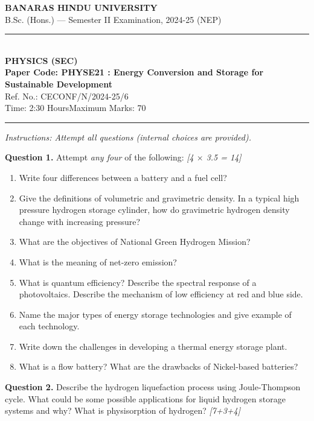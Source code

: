 \documentclass[11pt,a4paper]{article}
\newcommand{\pts}[1]{\hfill \textit{[#1]}}
\begin{document}
\begin{center}
  {\large\bfseries BANARAS HINDU UNIVERSITY}\\[2pt]
  {\normalsize B.Sc. (Hons.) --- Semester II Examination, 2024-25 (NEP)}\\[6pt]
  \rule{0.8\linewidth}{0.5pt}\\[6pt]
  {\large\bfseries PHYSICS (SEC)}\\[4pt]
  {\large\bfseries Paper Code: PHYSE21 : Energy Conversion and Storage for Sustainable Development}\\[2pt]
  {\small Ref. No.: CECONF/N/2024-25/6}\\[4pt]
  {\normalsize Time: 2:30 Hours\hfill Maximum Marks: 70}
\end{center}

\rule{\linewidth}{0.4pt}

\smallskip

\noindent \textit{Instructions: Attempt all questions (internal choices are provided).}

\bigskip

\noindent \textbf{Question 1.} Attempt \textit{any four} of the following: \pts{4 $\times$ 3.5 = 14}
\begin{enumerate}[label=(\alph*)]
  \item Write four differences between a battery and a fuel cell?
  \item Give the definitions of volumetric and gravimetric density. In a typical high pressure hydrogen storage cylinder, how do gravimetric hydrogen density change with increasing pressure?
  \item What are the objectives of National Green Hydrogen Mission?
  \item What is the meaning of net-zero emission?
  \item What is quantum efficiency? Describe the spectral response of a photovoltaics. Describe the mechanism of low efficiency at red and blue side.
  \item Name the major types of energy storage technologies and give example of each technology.
  \item Write down the challenges in developing a thermal energy storage plant.
  \item What is a flow battery? What are the drawbacks of Nickel-based batteries?
\end{enumerate}

\bigskip

\noindent \textbf{Question 2.} Describe the hydrogen liquefaction process using Joule-Thompson cycle. What could be some possible applications for liquid hydrogen storage systems and why? What is physisorption of hydrogen? \pts{7+3+4}
\end{document}
